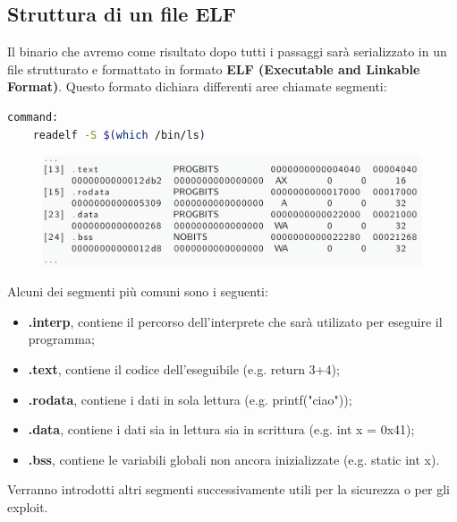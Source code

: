 \subsection{Struttura di un file ELF}
Il binario che avremo come risultato dopo tutti i passaggi sarà serializzato in un file strutturato e formattato in formato \textbf{ELF (Executable and Linkable Format)}.
Questo formato dichiara differenti aree chiamate segmenti:
\begin{lstlisting}[language=bash]
    command:
    readelf -S $(which /bin/ls)
\end{lstlisting}

\begin{figure}[h!]
    \centering
    \includegraphics[width=.6\linewidth]{res/ELF_Structure.png}
    \caption{}
\end{figure}
Alcuni dei segmenti più comuni sono i seguenti:
\begin{itemize}
    \item \textbf{.interp}, contiene il percorso dell'interprete che sarà utilizato per eseguire il programma;
    \item \textbf{.text}, contiene il codice dell'eseguibile (e.g. return 3+4);
    \item \textbf{.rodata}, contiene i dati in sola lettura (e.g. printf("ciao"));
    \item \textbf{.data}, contiene i dati sia in lettura sia in scrittura (e.g. int x = 0x41);
    \item \textbf{.bss}, contiene le variabili globali non ancora inizializzate (e.g. static int x).
\end{itemize}
Verranno introdotti altri segmenti successivamente utili per la sicurezza o per gli exploit.

